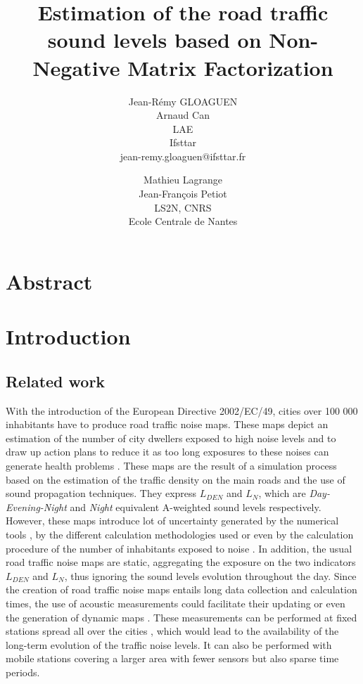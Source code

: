 \documentclass[twocolumn,a4paper,10pt]{article}
\title{Estimation of the road traffic sound levels based on Non-Negative Matrix Factorization}
\author{
    Jean-Rémy GLOAGUEN\\
    Arnaud Can\\
    LAE\\
    Ifsttar\\
    jean-remy.gloaguen@ifsttar.fr
  \and
    Mathieu Lagrange\\
	Jean-François Petiot \\
    LS2N, CNRS\\
    Ecole Centrale de  Nantes\\
}
\date{}
\begin{document}
\maketitle

\section*{Abstract}

\section{Introduction}
\subsection{Related work}
With the introduction of the European Directive 2002/EC/49, cities over 100 000 inhabitants have to produce road traffic noise maps. These maps depict an estimation of the number of city dwellers exposed to high noise levels and to draw up action plans to reduce it as too long exposures to these noises can generate health problems \cite{who_burden_2017}. These maps are the result of a simulation process based on the estimation of the traffic density on the main roads and the use of sound propagation techniques. They express $L_ {DEN}$ and $L_N$, which are \textit{Day-Evening-Night} and \textit{Night} equivalent A-weighted sound levels respectively. However, these maps introduce lot of uncertainty generated by the numerical tools \cite{van_leeuwen_noise_2015}, by the different calculation methodologies used \cite{leroy_uncertainty_2010}\cite{garg_critical_2014} or even by the calculation procedure of the number of inhabitants exposed to noise \cite{king_implementation_2011}. In addition, the usual road traffic noise maps are static, aggregating the exposure on the two indicators $L_{DEN}$ and $L_N$, thus ignoring the sound levels evolution throughout the day. Since the creation of road traffic noise maps entails long data collection and calculation times, the use of acoustic measurements could facilitate their updating or even the generation of dynamic maps \cite{wei_dynamic_2016}. These measurements can be performed at fixed stations spread all over the cities \cite{Mioduszewski} \cite{mietlicki2012innovative}, which would lead to the availability of the long-term evolution of the traffic noise levels. It can also be performed with  mobile stations \cite{can_exploring_2012} \cite{manvell2004sadmam} covering a larger area with fewer sensors but also sparse time periods. 
\end{document}
